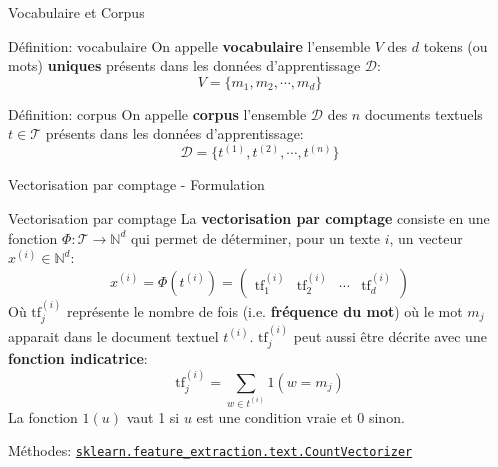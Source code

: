 \begin{frame}{Vocabulaire et Corpus}
	\begin{block}{Définition: vocabulaire}
		On appelle \textbf{vocabulaire} l'ensemble $V$ des $d$ tokens (ou mots) \textbf{uniques} présents dans les données d'apprentissage $\mathcal{D}$:
		\begin{equation}
			V = \{m_1, m_2, \cdots, m_d\}
			\nonumber
		\end{equation}
	\end{block}
	\pause
	\begin{block}{Définition: corpus}
		On appelle \textbf{corpus} l'ensemble $\mathcal{D}$ des $n$ documents textuels $t \in \mathcal{T}$  présents dans les données d'apprentissage:
		\begin{equation}
			\mathcal{D} = \{t^{(1)}, t^{(2)}, \cdots, t^{(n)}\}
			\nonumber
		\end{equation}
	\end{block}	
\end{frame}

\begin{frame}{Vectorisation par comptage - Formulation}
	\begin{block}{Vectorisation par comptage}
		La \textbf{vectorisation par comptage} consiste en une fonction $\Phi: \mathcal{T} \to \mathbb{N}^d$ qui permet de déterminer, pour un texte $i$, un vecteur $x^{(i)} \in \mathbb{N}^d$:
		\begin{equation}
			x^{(i)} = \Phi(t^{(i)}) = \begin{pmatrix}
				\text{tf}^{(i)}_1 &	\text{tf}^{(i)}_2 &	\cdots & \text{tf}^{(i)}_d
			\end{pmatrix}
			\nonumber
		\end{equation}
		Où $\text{tf}^{(i)}_j$ représente le nombre de fois (i.e. \textbf{fréquence du mot}) où le mot $m_j$ apparait dans le document textuel $t^{(i)}$. $\text{tf}^{(i)}_j$ peut aussi être décrite avec une \textbf{fonction indicatrice}:
		\begin{equation}
			\text{tf}^{(i)}_j = \underset{w \in t^{(i)}}{\sum} 1(w = m_j)
			\nonumber
		\end{equation}
		La fonction $1(u)$ vaut 1 si $u$ est une condition vraie et 0 sinon.
	\end{block}
	\vfill
	Méthodes: \href{https://scikit-learn.org/stable/modules/generated/sklearn.feature_extraction.text.CountVectorizer.html}{\texttt{sklearn.feature\_extraction.text.CountVectorizer}}
\end{frame}

